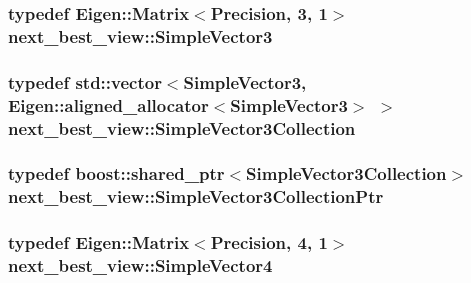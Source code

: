 \hypertarget{namespacenext__best__view_a59fc75b908e198bc02a9b19ba88edf12}{
\subsubsection[{\-Simple\-Vector3}]{\setlength{\rightskip}{0pt plus 5cm}typedef \-Eigen\-::\-Matrix$<${\bf \-Precision}, 3, 1$>$ {\bf next\-\_\-best\-\_\-view\-::\-Simple\-Vector3}}}\label{namespacenext__best__view_a59fc75b908e198bc02a9b19ba88edf12}
\hypertarget{namespacenext__best__view_a4a345e75760a974fd27b07c10dca3269}{
\subsubsection[{\-Simple\-Vector3\-Collection}]{\setlength{\rightskip}{0pt plus 5cm}typedef std\-::vector$<${\bf \-Simple\-Vector3}, \-Eigen\-::aligned\-\_\-allocator$<${\bf \-Simple\-Vector3}$>$ $>$ {\bf next\-\_\-best\-\_\-view\-::\-Simple\-Vector3\-Collection}}}\label{namespacenext__best__view_a4a345e75760a974fd27b07c10dca3269}
\hypertarget{namespacenext__best__view_ad0c836f196d199ad5f3b89c2eb24e96e}{
\subsubsection[{\-Simple\-Vector3\-Collection\-Ptr}]{\setlength{\rightskip}{0pt plus 5cm}typedef boost\-::shared\-\_\-ptr$<${\bf \-Simple\-Vector3\-Collection}$>$ {\bf next\-\_\-best\-\_\-view\-::\-Simple\-Vector3\-Collection\-Ptr}}}\label{namespacenext__best__view_ad0c836f196d199ad5f3b89c2eb24e96e}
\hypertarget{namespacenext__best__view_a209f68566d35160dd94fca758a33df33}{
\subsubsection[{\-Simple\-Vector4}]{\setlength{\rightskip}{0pt plus 5cm}typedef \-Eigen\-::\-Matrix$<${\bf \-Precision}, 4, 1$>$ {\bf next\-\_\-best\-\_\-view\-::\-Simple\-Vector4}}}\label{namespacenext__best__view_a209f68566d35160dd94fca758a33df33}
